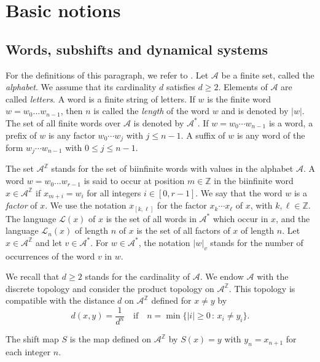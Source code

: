 \documentclass{article}
\theoremstyle{definition}
\newcommand{\Z}{\mathbb{Z}}
\begin{document}
\section{Basic notions} \label{sec:basicnotions}
\subsection{Words, subshifts and dynamical systems} 
For the definitions of this paragraph, we refer to \cite{Pyth.02,Queffelec:2010}.
Let $\mathcal{A}$ be a finite set, called the {\em alphabet}. We assume that its cardinality $d$ satisfies $d\ge 2$. Elements of $\mathcal{A}$ are called \emph{letters}.
A word is a finite   string of letters. If $w$ is the  finite word $w=w_0\dots w_{n-1}$, then $n$ is called the  {\em length} of the word $w$ and is denoted by $|w|$. The set of all finite words over $\mathcal{A}$ is denoted by $\mathcal{A}^*$. 
If $w=w_{0}\cdots w_{n-1}$ is a word, a prefix of $w$ is any factor $w_{0}\cdots w_{j}$ with $j\le n-1$. A suffix of $w$ is any word of the form $w_{j}\cdots w_{n-1}$ with $0\le j\le n-1$.   





The set   $\mathcal{A}^\mathbb{Z}$  stands for the set of biinfinite words   with values in the alphabet  $\mathcal{A} $.
A word $w=w_0\dots w_{r-1}$ is said to occur at position $m \in \Z$ in the biinfinite word $x \in \mathcal{A}^\mathbb{Z} $ if  $x_{m+i}=w_i$ for all  integers $i\in[0,r-1]$. We say that the word $w$ is a \emph{factor} of $x$. We  use the notation $x_{[k,\ell]}$ for the  factor $x_k \cdots x_{\ell}$ of $x$, with $k, \ell \in \mathbb{Z}$. The language $\mathcal L(x)$ of $x$   is the set of all words  in $\mathcal{A}^*$ which occur in $x$, and the language   $\mathcal L_{n}(x)$ of length $n$ of $x$  is the set of all  factors of $x$ of length $n$.   Let $x \in \mathcal{A}^{\mathbb{Z}}$ and let $v \in \mathcal{A}^*$.  For $w \in  \mathcal{A}^*$,  the notation $|w|_v$ stands for the number of occurrences of the word $v$ in  $w$.


We recall that $d \geq 2$ stands for  the  cardinality of $\mathcal A$.   We endow $\mathcal A$ with the discrete topology and consider the product topology on $\mathcal A^{\mathbb Z}$. This topology is compatible with the distance $d$ on $\mathcal A^{\mathbb Z}$ defined for $x\neq y$  by
$$d(x,y)=\frac{1}{d^n}\quad \text{if}\quad n=\min\{|i|\geq 0 \,: \,  x_i\neq y_i\}.$$

The shift map $S$ is the map defined on    $\mathcal{A}^\mathbb{Z}$  by $S(x)=y$ with $y_n=x_{n+1}$ for each integer $n$.
\end{document}
